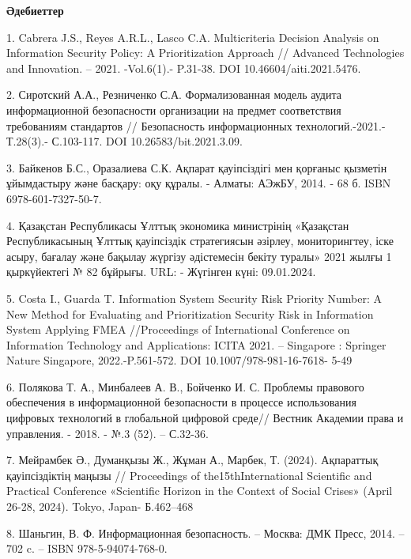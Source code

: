 \begin{center}
{\bfseries Әдебиеттер}
\end{center}

\begin{references}
1. Cabrera J.S., Reyes A.R.L., Lasco C.A. Multicriteria Decision Analysis
on Information Security Policy: A Prioritization Approach // Advanced
Technologies and Innovation. -- 2021. -Vol.6(1).- P.31-38. DOI
10.46604/aiti.2021.5476.

2. Сиротский А.А., Резниченко С.А. Формализованная модель аудита
информационной безопасности организации на предмет соответствия
требованиям стандартов // Безопасность информационных
технологий.-2021.-Т.28(3).- С.103-117. DOI 10.26583/bit.2021.3.09.

3. Байкенов Б.С., Оразалиева С.К. Ақпарат қауіпсіздігі мен қорғаныс
қызметін ұйымдастыру және басқару: оқу құралы. - Алматы: АЭжБУ, 2014. -
68 б. ISBN 6978-601-7327-50-7.

4. Қазақстан Республикасы Ұлттық экономика министрінің «Қазақстан
Республикасының Ұлттық қауіпсіздік стратегиясын әзірлеу, мониторингтеу,
іске асыру, бағалау және бақылау жүргізу әдістемесін бекіту туралы» 2021
жылғы 1 қыркүйектегі № 82 бұйрығы. URL:
\href{https://adilet.zan.kz/kaz/docs/V2100024227}{}
- Жүгінген күні: 09.01.2024.

5. Costa I., Guarda T. Information System Security Risk Priority Number:
A New Method for Evaluating and Prioritization Security Risk in
Information System Applying FMEA //Proceedings of International
Conference on Information Technology and Applications: ICITA 2021. --
Singapore : Springer Nature Singapore, 2022.-P.561-572. DOI
10.1007/978-981-16-7618- 5-49

6. Полякова Т. А., Минбалеев А. В., Бойченко И. С. Проблемы правового
обеспечения в информационной безопасности в процессе использования
цифровых технологий в глобальной цифровой среде// Вестник Академии права
и управления. - 2018. - №.3 (52). -- С.32-36.

7. Мейрамбек Ә., Думанқызы Ж., Жұман А., Марбек, Т. (2024). Ақпараттық
қауіпсіздіктің маңызы // Proceedings of the15thInternational Scientific
and Practical Conference «Scientific Horizon in the Context of Social
Crises» (April 26-28, 2024). Tokyo, Japan- Б.462--468

\href{https://doi.org/10.3390/app1108333}{}

8. Шаньгин, В. Ф. Информационная безопасность. -- Москва: ДМК Пресс,
2014. -- 702 c. -- ISBN 978-5-94074-768-0.


\end{references}
